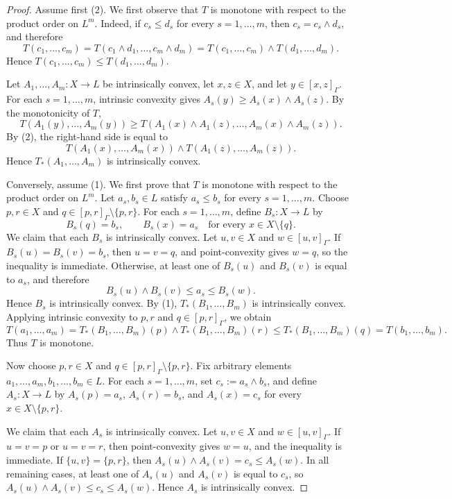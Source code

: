 \documentclass[10pt,a4paper]{amsart}
\begin{document}
\begin{proof}
Assume first (2). We first observe that \(T\) is monotone with respect to the product order on \(L^m\). Indeed, if \(c_s\leq d_s\) for every \(s=1,\dots,m\), then \(c_s=c_s\wedge d_s\), and therefore
\[
T(c_1,\dots,c_m)
=
T(c_1\wedge d_1,\dots,c_m\wedge d_m)
=
T(c_1,\dots,c_m)\wedge T(d_1,\dots,d_m).
\]
Hence \(T(c_1,\dots,c_m)\leq T(d_1,\dots,d_m)\).

Let \(A_1,\dots,A_m:X\to L\) be intrinsically convex, let \(x,z\in X\), and let \(y\in[x,z]_{\Gamma}\). For each \(s=1,\dots,m\), intrinsic convexity gives \(A_s(y)\geq A_s(x)\wedge A_s(z)\). By the monotonicity of \(T\),
\[
T(A_1(y),\dots,A_m(y))
\geq
T(A_1(x)\wedge A_1(z),\dots,A_m(x)\wedge A_m(z)).
\]
By (2), the right-hand side is equal to
\[
T(A_1(x),\dots,A_m(x))\wedge T(A_1(z),\dots,A_m(z)).
\]
Hence \(T_*(A_1,\dots,A_m)\) is intrinsically convex.

Conversely, assume (1). We first prove that \(T\) is monotone with respect to the product order on \(L^m\). Let \(a_s,b_s\in L\) satisfy \(a_s\leq b_s\) for every \(s=1,\dots,m\). Choose \(p,r\in X\) and \(q\in[p,r]_{\Gamma}\setminus\{p,r\}\). For each \(s=1,\dots,m\), define \(B_s:X\to L\) by
\[
B_s(q)=b_s,
\qquad
B_s(x)=a_s\quad\text{for every }x\in X\setminus\{q\}.
\]
We claim that each \(B_s\) is intrinsically convex. Let \(u,v\in X\) and \(w\in[u,v]_{\Gamma}\). If \(B_s(u)=B_s(v)=b_s\), then \(u=v=q\), and point-convexity gives \(w=q\), so the inequality is immediate. Otherwise, at least one of \(B_s(u)\) and \(B_s(v)\) is equal to \(a_s\), and therefore
\[
B_s(u)\wedge B_s(v)\leq a_s\leq B_s(w).
\]
Hence \(B_s\) is intrinsically convex. By (1), \(T_*(B_1,\dots,B_m)\) is intrinsically convex. Applying intrinsic convexity to \(p,r\) and \(q\in[p,r]_{\Gamma}\), we obtain
\[
T(a_1,\dots,a_m)
=
T_*(B_1,\dots,B_m)(p)
\wedge
T_*(B_1,\dots,B_m)(r)
\leq
T_*(B_1,\dots,B_m)(q)
=
T(b_1,\dots,b_m).
\]
Thus \(T\) is monotone.

Now choose \(p,r\in X\) and \(q\in[p,r]_{\Gamma}\setminus\{p,r\}\). Fix arbitrary elements \(a_1,\dots,a_m,b_1,\dots,b_m\in L\). For each \(s=1,\dots,m\), set \(c_s:=a_s\wedge b_s\), and define \(A_s:X\to L\) by \(A_s(p)=a_s\), \(A_s(r)=b_s\), and \(A_s(x)=c_s\) for every \(x\in X\setminus\{p,r\}\).

We claim that each \(A_s\) is intrinsically convex. Let \(u,v\in X\) and \(w\in[u,v]_{\Gamma}\). If \(u=v=p\) or \(u=v=r\), then point-convexity gives \(w=u\), and the inequality is immediate. If \(\{u,v\}=\{p,r\}\), then \(A_s(u)\wedge A_s(v)=c_s\le A_s(w)\). In all remaining cases, at least one of \(A_s(u)\) and \(A_s(v)\) is equal to \(c_s\), so \(A_s(u)\wedge A_s(v)\le c_s\le A_s(w)\). Hence \(A_s\) is intrinsically convex.


\end{proof}
\end{document}
